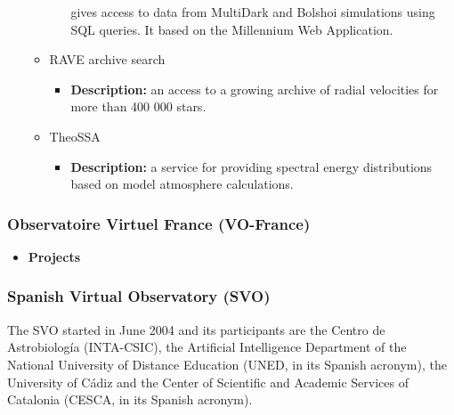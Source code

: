 \documentclass[11pt]{article}
\begin{document}
\begin{itemize}
\begin{itemize}
\begin{itemize}
gives access to data from MultiDark and Bolshoi simulations using SQL queries.
It based on the Millennium Web Application.
                                \end{itemize}
                            \item RAVE archive search
                                \begin{itemize}
                                    \item \textbf{Description:} an access to a
growing archive of radial velocities for more than 400 000 stars.
                                \end{itemize}
                            \item TheoSSA
                                \begin{itemize}
                                    \item \textbf{Description:} a service for
providing spectral energy distributions based on model atmosphere calculations.
                                \end{itemize}
                        \end{itemize}
                \end{itemize}

            \subsubsection{Observatoire Virtuel France (VO-France)}
                \begin{itemize}
                    \item \textbf{Projects}
                \end{itemize}

            \subsubsection{Spanish Virtual Observatory (SVO)}
                The SVO started in June 2004 and its participants are the Centro
de Astrobiolog\'{i}a (INTA-CSIC), the Artificial Intelligence Department of the
National University of Distance Education (UNED, in its Spanish acronym), the
University of C\'{a}diz and the Center of Scientific and Academic Services of
Catalonia (CESCA, in its Spanish acronym).
\end{document}
